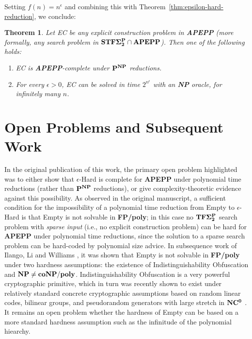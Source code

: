 \documentclass[11pt]{article}
\newtheorem{theorem}{Theorem}
\def\cl{\bf}
\begin{document}
Setting $f(n) = n^\epsilon$ and combining this with Theorem~\ref{thm:epsilon-hard-reduction}, we conclude:
\begin{theorem}\label{thm:dichotomy}
Let {\sc EC} be any explicit construction problem in {\cl APEPP} (more formally, any search problem in ${\cl STF\Sigma^P_2} \cap {\cl APEPP}$). Then one of the following holds:
\begin{enumerate}
    \item {\sc EC} is {\cl APEPP}-complete under ${\cl P}^{\cl NP}$ reductions.
    \item For every $\epsilon > 0$, {\sc EC} can be solved in time $2^{n^{\epsilon}}$ with an {\cl NP} oracle, for infinitely many $n$.
\end{enumerate}
\end{theorem}

\section{Open Problems and Subsequent Work}\label{sec:open}
In the original publication of this work, the primary open problem highlighted was to either show that {\sc $\epsilon$-Hard} is complete for {\cl APEPP} under polynomial time reductions (rather than ${\cl P^{NP}}$ reductions), or give complexity-theoretic evidence against this possibility. As observed in the original manuscript, a sufficient condition for the impossibility of a polynomial time reduction from {\sc Empty} to {\sc $\epsilon$-Hard} is that {\sc Empty} is not solvable in {\cl FP/poly}; in this case no ${\cl TF\Sigma_2^P}$ search problem with \emph{sparse input} (i.e., no explicit construction problem) can be hard for {\cl APEPP} under polynomial time reductions, since the solution to a sparse search problem can be hard-coded by polynomial size advice. In subsequence work of Ilango, Li and Williams \cite{ILW}, it was shown that {\sc Empty} is not solvable in {\cl FP/poly} under two hardness assumptions: the existence of Indistinguishability Obfuscation and ${\cl NP} \neq {\cl coNP/poly}$. Indistinguishability Obfuscation is a very powerful cryptographic primitive, which in turn was recently shown to exist under relatively standard concrete cryptographic assumptions based on random linear codes, bilinear groups, and pseudorandom generators with large stretch in ${\cl NC^0}$ \cite{jls1,jls2}. It remains an open problem whether the hardness of {\sc Empty} can be based on a more standard hardness assumption such as the infinitude of the polynomial hiearchy.
\end{document}

